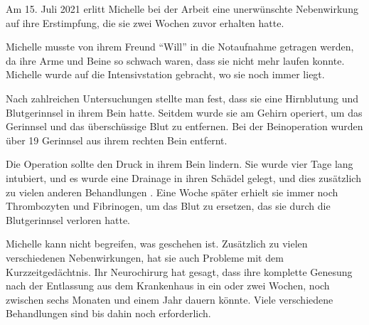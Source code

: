 Am 15. Juli 2021 erlitt Michelle bei der Arbeit eine unerwünschte Nebenwirkung
auf ihre Erstimpfung, die sie zwei Wochen zuvor erhalten hatte.

Michelle musste von ihrem Freund ``Will'' in die Notaufnahme getragen werden, da
ihre Arme und Beine so schwach waren, dass sie nicht mehr laufen
konnte. Michelle wurde auf die Intensivstation gebracht, wo sie noch immer
liegt.

Nach zahlreichen Untersuchungen stellte man fest, dass sie eine Hirnblutung und
Blutgerinnsel in ihrem Bein hatte. Seitdem wurde sie am Gehirn operiert, um das
Gerinnsel und das überschüssige Blut zu entfernen. Bei der Beinoperation wurden
über 19 Gerinnsel aus ihrem rechten Bein entfernt.

Die Operation sollte den Druck in ihrem Bein lindern. Sie wurde vier Tage lang
intubiert, und es wurde eine Drainage in ihren Schädel gelegt, und dies
zusätzlich zu vielen anderen Behandlungen . Eine Woche später erhielt sie immer
noch Thrombozyten und Fibrinogen, um das Blut zu ersetzen, das sie durch die
Blutgerinnsel verloren hatte.

Michelle kann nicht begreifen, was geschehen ist. Zusätzlich zu vielen
verschiedenen Nebenwirkungen, hat sie auch Probleme mit dem
Kurzzeitgedächtnis. Ihr Neurochirurg hat gesagt, dass ihre komplette Genesung
nach der Entlassung aus dem Krankenhaus in ein oder zwei Wochen, noch zwischen
sechs Monaten und einem Jahr dauern könnte. Viele verschiedene Behandlungen sind
bis dahin noch erforderlich.

